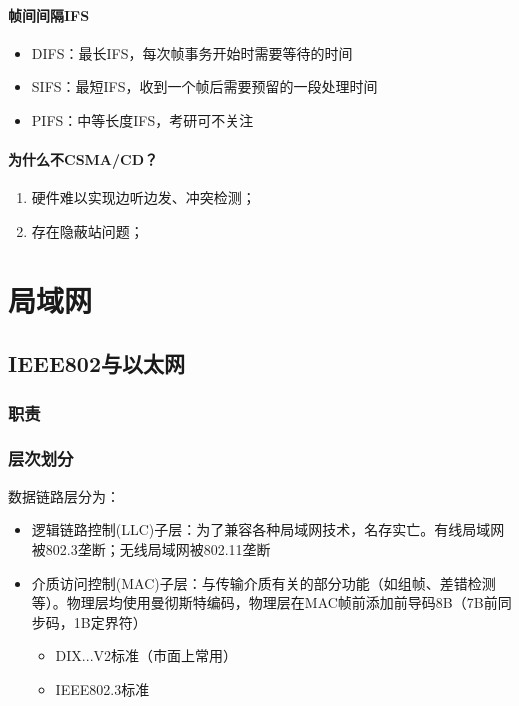 \paragraph{帧间间隔IFS}
\begin{itemize}
    \item DIFS：最长IFS，每次帧事务开始时需要等待的时间
    \item SIFS：最短IFS，收到一个帧后需要预留的一段处理时间
    \item PIFS：中等长度IFS，考研可不关注
\end{itemize}


\paragraph{为什么不CSMA/CD？}
\begin{enumerate}
    \item 硬件难以实现边听边发、冲突检测；
    \item 存在隐蔽站问题；
\end{enumerate}


\section{局域网}

\subsection{IEEE802与以太网}

\subsubsection{职责}

\subsubsection{层次划分}
数据链路层分为：\begin{itemize}
    \item 逻辑链路控制(LLC)子层：为了兼容各种局域网技术，名存实亡。有线局域网被802.3垄断；无线局域网被802.11垄断
    \item 介质访问控制(MAC)子层：与传输介质有关的部分功能（如组帧、差错检测等）。物理层均使用曼彻斯特编码，物理层在MAC帧前添加前导码8B（7B前同步码，1B定界符）
    \begin{itemize}
        \item DIX...V2标准（市面上常用）
        \item IEEE802.3标准
    \end{itemize}
\end{itemize}


